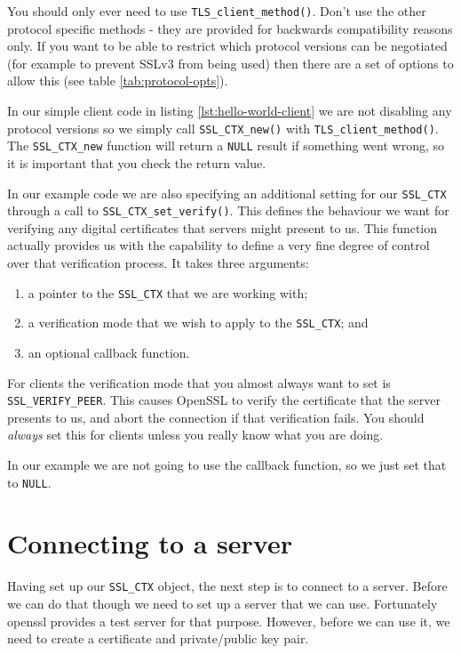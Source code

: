 You should only ever need to use \verb!TLS_client_method()!. Don't use
the other protocol specific methods - they are provided for backwards
compatibility reasons only. If you want to  be able to restrict which protocol
versions can be negotiated (for example to prevent SSLv3 from being used) then
there are a set of options to allow this  (see table \ref{tab:protocol-opts}).


In our simple client code in listing \ref{lst:hello-world-client} we are not
disabling any protocol versions so we simply call \verb!SSL_CTX_new()! with
\verb!TLS_client_method()!. The \verb!SSL_CTX_new! function will return a
\verb!NULL! result if something went wrong, so it is important that you check
the return value.

In our example code we are also specifying an additional setting for our
\verb!SSL_CTX! through a call to \verb!SSL_CTX_set_verify()!. This defines the 
behaviour we want for verifying any digital certificates that servers might
present to us. This function actually provides us with the capability to define 
a very fine degree of control over that verification process. It takes three 
arguments:
\begin{enumerate}
\item a pointer to the \texttt{SSL\_CTX} that we are working with;
\item a verification mode that we wish to apply to the \texttt{SSL\_CTX}; and
\item an optional callback function.
\end{enumerate}

For clients the verification mode that you almost always want to set is 
\verb!SSL_VERIFY_PEER!. This causes OpenSSL to verify the certificate that the 
server presents to us, and abort the connection if that verification fails. You
should \emph{always} set this for clients unless you really know what you are 
doing.

In our example we are not going to use the callback function, so we just set 
that to \verb!NULL!.

\section {Connecting to a server}

Having set up our \verb!SSL_CTX! object, the next step is to connect to a
server.  Before we can do that though we need to set up a server that we can
use.  Fortunately openssl provides a test server for that purpose. However,
before we  can use it, we need to create a certificate and private/public key
pair.

